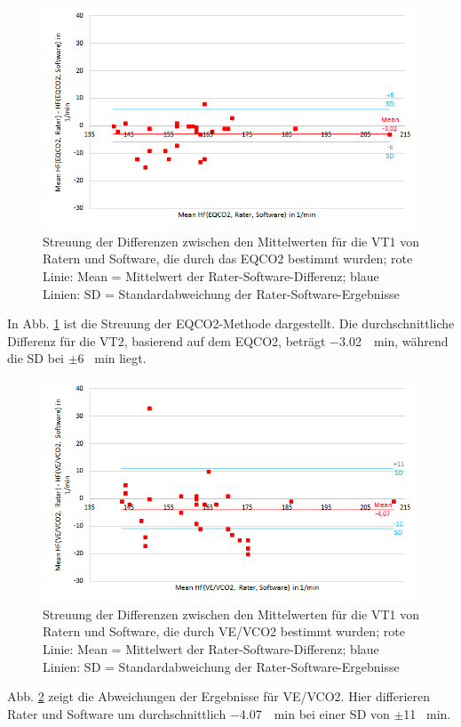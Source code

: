 \begin{figure}[H]
	\centering
	\includegraphics[scale=0.7]{Bilder/mean_eqco2}
	\caption[Streuung der \acs{EQCO2}-Ergebnisse zwischen Ratern und Software]{Streuung der Differenzen zwischen den Mittelwerten für die VT1 von Ratern und Software, die durch das \acs{EQCO2} bestimmt wurden; rote Linie: Mean = Mittelwert der Rater-Software-Differenz; blaue Linien: SD = Standardabweichung der Rater-Software-Ergebnisse}
	\label{pic:pic26}
\end{figure}
%
In Abb. \ref{pic:pic26} ist die Streuung der \acs{EQCO2}-Methode dargestellt. Die durchschnittliche Differenz für die VT2, basierend auf dem \acs{EQCO2}, beträgt \SI{-3,02}{\per\minute}, während die \acs{SD} bei $\pm$6 \si{\per\minute} liegt.
%
\begin{figure}[H]
	\centering
	\includegraphics[scale=0.7]{Bilder/mean_vevco2}
	\caption[Streuung der \acs{VE}/\acs{VCO2}-Ergebnisse zwischen Ratern und Software]{Streuung der Differenzen zwischen den Mittelwerten für die VT1 von Ratern und Software, die durch \acs{VE}/\acs{VCO2} bestimmt wurden; rote Linie: Mean = Mittelwert der Rater-Software-Differenz; blaue Linien: SD = Standardabweichung der Rater-Software-Ergebnisse}
	\label{pic:pic27}
\end{figure}
%
Abb. \ref{pic:pic27} zeigt die Abweichungen der Ergebnisse für \acs{VE}/\acs{VCO2}. Hier differieren Rater und Software um durchschnittlich \SI{-4,07}{\per\minute} bei einer \acs{SD} von $\pm$11 \si{\per\minute}.